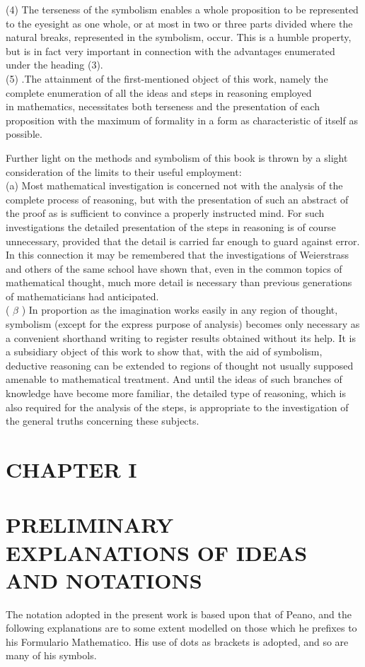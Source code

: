 \documentclass[10pt]{article}
\begin{document}
(4) The terseness of the symbolism enables a whole proposition to be represented to the eyesight as one whole, or at most in two or three parts divided where the natural breaks, represented in the symbolism, occur. This is a humble property, but is in fact very important in connection with the advantages enumerated under the heading (3).\\
(5) .The attainment of the first-mentioned object of this work, namely the complete enumeration of all the ideas and steps in reasoning employed\\
in mathematics, necessitates both terseness and the presentation of each proposition with the maximum of formality in a form as characteristic of itself as possible.

Further light on the methods and symbolism of this book is thrown by a slight consideration of the limits to their useful employment:\\
(a) Most mathematical investigation is concerned not with the analysis of the complete process of reasoning, but with the presentation of such an abstract of the proof as is sufficient to convince a properly instructed mind. For such investigations the detailed presentation of the steps in reasoning is of course unnecessary, provided that the detail is carried far enough to guard against error. In this connection it may be remembered that the investigations of Weierstrass and others of the same school have shown that, even in the common topics of mathematical thought, much more detail is necessary than previous generations of mathematicians had anticipated.\\
( $\beta$ ) In proportion as the imagination works easily in any region of thought, symbolism (except for the express purpose of analysis) becomes only necessary as a convenient shorthand writing to register results obtained without its help. It is a subsidiary object of this work to show that, with the aid of symbolism, deductive reasoning can be extended to regions of thought not usually supposed amenable to mathematical treatment. And until the ideas of such branches of knowledge have become more familiar, the detailed type of reasoning, which is also required for the analysis of the steps, is appropriate to the investigation of the general truths concerning these subjects.

\section*{CHAPTER I}
\section*{PRELIMINARY EXPLANATIONS OF IDEAS AND NOTATIONS}
The notation adopted in the present work is based upon that of Peano, and the following explanations are to some extent modelled on those which he prefixes to his Formulario Mathematico. His use of dots as brackets is adopted, and so are many of his symbols.
\end{document}
